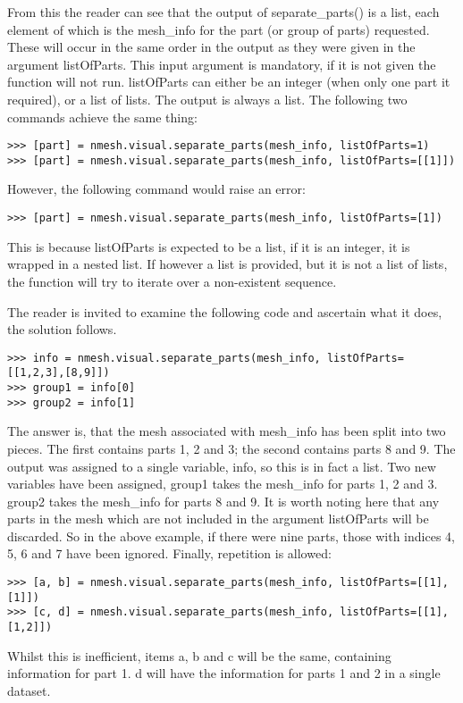 From this the reader can see that the output of {\ttfamily separate\_parts()} is a list, each element of which is the {\ttfamily mesh\_info} for the part (or group of parts) requested. These will occur in the same order in the output as they were given in the argument {\ttfamily listOfParts}. This input argument is mandatory, if it is not given the function will not run. {\ttfamily listOfParts} can either be an integer (when only one part it required), or a list of lists. The output is always a list. The following two commands achieve the same thing:
\begin{lstlisting}[basicstyle=\small\ttfamily]
>>> [part] = nmesh.visual.separate_parts(mesh_info, listOfParts=1)
>>> [part] = nmesh.visual.separate_parts(mesh_info, listOfParts=[[1]])
\end{lstlisting}
However, the following command would raise an error:
\begin{lstlisting}[basicstyle=\small\ttfamily]
>>> [part] = nmesh.visual.separate_parts(mesh_info, listOfParts=[1])
\end{lstlisting}
This is because {\ttfamily listOfParts} is expected to be a list, if it is an integer, it is wrapped in a nested list. If however a list is provided, but it is not a list of lists, the function will try to iterate over a non-existent sequence.


The reader is invited to examine the following code and ascertain what it does, the solution follows.
\begin{lstlisting}[basicstyle=\small\ttfamily]
>>> info = nmesh.visual.separate_parts(mesh_info, listOfParts=[[1,2,3],[8,9]])
>>> group1 = info[0]
>>> group2 = info[1]
\end{lstlisting}
The answer is, that the mesh associated with {\ttfamily mesh\_info} has been split into two pieces. The first contains parts 1, 2 and 3; the second contains parts 8 and 9. The output was assigned to a single variable, {\ttfamily info}, so this is in fact a list. Two new variables have been assigned, {\ttfamily group1} takes the {\ttfamily mesh\_info} for parts 1, 2 and 3. {\ttfamily group2} takes the {\ttfamily mesh\_info} for parts 8 and 9. It is worth noting here that any parts in the mesh which are not included in the argument {\ttfamily listOfParts} will be discarded. So in the above example, if there were nine parts, those with indices 4, 5, 6 and 7 have been ignored. Finally, repetition is allowed:
\begin{lstlisting}[basicstyle=\small\ttfamily]
>>> [a, b] = nmesh.visual.separate_parts(mesh_info, listOfParts=[[1],[1]])
>>> [c, d] = nmesh.visual.separate_parts(mesh_info, listOfParts=[[1],[1,2]])
\end{lstlisting}
Whilst this is inefficient, items {\ttfamily a}, {\ttfamily b} and {\ttfamily c} will be the same, containing information for part 1. {\ttfamily d} will have the information for parts 1 and 2 in a single dataset.




